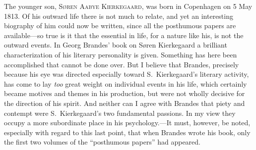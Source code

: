 \documentclass[12pt,a4paper]{book}
\newcommand{\opage}[1]{\marginnote{\footnotesize\textit{[#1]}}}
\begin{document}
The younger son, \textsc{Søren Aabye Kierkegaard}, was born in Copenhagen
on 5 May 1813. Of his outward life there is not much to relate, and yet
an interesting biography of him could now be written, since all the
posthumous papers are available---so true is it that the essential in
life, for a nature like his, is not the outward events. In Georg Brandes'
book on Søren Kierkegaard a brilliant characterization of his literary
personality is given. Something has here been accomplished that cannot be
done over. But I believe that Brandes, precisely because his eye was
directed especially toward S.~Kierkegaard's literary activity, has come
to lay \textit{too} great weight on individual events in his life, which
certainly became motives and themes in his production, but were not
wholly decisive for the direction of his spirit. And neither can I agree
with Brandes that piety and contempt were S.~Kierkegaard's two
fundamental passions. In my
\opage{31}view they occupy a more subordinate place in his
psychology.---It must, however, be noted, especially with regard to this
last point, that when Brandes wrote his book, only the first two volumes
of the ``posthumous papers'' had appeared.
\end{document}
